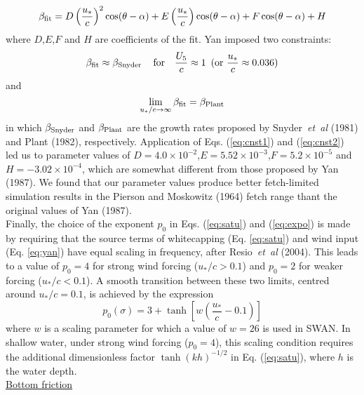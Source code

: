 \documentclass[12pt]{book}
\begin{document}
\begin{equation}
  \beta_{\rm fit} = D \left( \frac{u_*}{c} \right)^2 \cos(\theta-\alpha) + E \left( \frac{u_*}{c} \right) \cos(\theta-\alpha) +
                    F \cos(\theta-\alpha) + H
  \label{eq:yan}
\end{equation}
where $D$,$E$,$F$ and $H$ are coefficients of the fit. Yan imposed two constraints:
\begin{equation}
  \beta_{\rm fit} \approx \beta_{\rm Snyder}\, \quad \mbox{for} \quad \frac{U_5}{c} \approx 1\,\,\, (\mbox{or} \,\, \frac{u_*}{c} \approx 0.036)
  \label{eq:cnst1}
\end{equation}
and
\begin{equation}
  \lim \limits_{u_*/c \rightarrow \infty} \beta_{\rm fit} = \beta_{\rm Plant}
  \label{eq:cnst2}
\end{equation}
in which $\beta_{\rm Snyder}$ and $\beta_{\rm Plant}$ are the growth rates proposed by Snyder~{\it et~al} (1981) and Plant (1982), respectively.
Application of Eqs. (\ref{eq:cnst1}) and (\ref{eq:cnst2}) led us to parameter values of $D=4.0 \times 10^{-2}$,$E=5.52 \times 10^{-3}$,$F=5.2 \times 10^{-5}$
and $H=-3.02 \times 10^{-4}$, which are somewhat different from those proposed by Yan (1987). We found that our parameter values produce better
fetch-limited simulation results in the Pierson and Moskowitz (1964) fetch range thant the original values of Yan (1987).
\\[2ex]
\noindent
Finally, the choice of the exponent $p_0$ in Eqs. (\ref{eq:satu}) and (\ref{eq:expo}) is made by requiring that the source terms of whitecapping
(Eq. \ref{eq:satu}) and wind input (Eq. \ref{eq:yan}) have equal scaling in frequency, after Resio~{\it et~al} (2004). This leads to a value of
$p_0 = 4$ for strong wind forcing ($u_*/c > 0.1$) and $p_0 = 2$ for weaker forcing ($u_*/c < 0.1$). A smooth transition between these two limits,
centred around $u_*/c = 0.1$, is achieved by the expression
\begin{equation}
  p_0(\sigma) = 3 + \tanh \left[ w \left( \frac{u_*}{c} - 0.1 \right) \right]
\end{equation}
where $w$ is a scaling parameter for which a value of $w = 26$ is used in SWAN. In shallow water, under strong wind forcing ($p_0=4$), this
scaling condition requires the additional dimensionless factor ${\tanh(kh)}^{-1/2}$ in Eq. (\ref{eq:satu}), where $h$ is the water depth.
\nocite{Res04LV}
\\[2ex]
\noindent
\underline{Bottom friction}\\[2ex]
\end{document}
